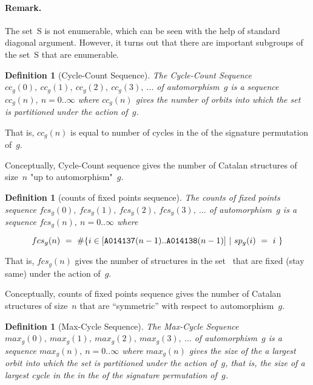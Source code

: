 \documentclass[11pt]{article} %
\newcommand{\autletter}[1]{$#1$}
\newcommand{\automorphismlet}[1]{automorphism~\autletter{#1}}
\newcommand{\EISseq}[1]{{\tt #1}}
\newcommand{\SET}[1]{{\textsc{#1}}}
\newtheorem{definition}[theorem]{Definition}
\begin{document}
\paragraph{Remark.}
The set~\SET{S} is not enumerable, which can be seen with the help
of standard diagonal argument.
However, it turns out that there are important subgroups of
the set~\SET{S} that are enumerable.


\begin{definition}[{Cycle-Count Sequence}]
\normalfont

The Cycle-Count Sequence $cc_{g}(0),~cc_{g}(1),~cc_{g}(2),~cc_{g}(3),~...$
of \automorphismlet{g} is a sequence
$cc_{g}(n),~n=0..\infty$
where $cc_g(n)$ gives the number of orbits into which the set~{\CatsetN}
is partitioned under the action of~$g$.
\end{definition}

That is, $cc_{g}(n)$ is equal to number of cycles
in the {\Subrange}
of the signature permutation of~$g$.

Conceptually, Cycle-Count sequence gives the number of Catalan structures of size~$n$
"up to automorphism"~$g$.

\begin{definition}[{counts of fixed points sequence}]
\normalfont

The counts of fixed points sequence $fcs_{g}(0),~fcs_{g}(1),~fcs_{g}(2),~fcs_{g}(3),~...$
of \automorphismlet{g} is a sequence
$fcs_{g}(n),~n=0..\infty$
where

$$
fcs_{g}(n)~=~\#\{i \in [\EISseq{A014137}(n-1)..\EISseq{A014138}(n-1)]~|~sp_{g}(i)~=~i~\}
$$

\end{definition}

That is, $fcs_{g}(n)$
gives the number of structures in the set~{\CatsetN}
that are fixed (stay same) under the action of~$g$.

Conceptually, counts of fixed points sequence gives the number of Catalan structures of size~$n$
that are ``symmetric'' with respect to automorphism~$g$.



\begin{definition}[{Max-Cycle Sequence}]
\normalfont

The Max-Cycle Sequence $max_{g}(0),~max_{g}(1),~max_{g}(2),~max_{g}(3),~...$
of \automorphismlet{g} is a sequence
$max_{g}(n),~n=0..\infty$
where $max_g(n)$ gives the size of the a largest orbit into which the set
{\CatsetN}
is partitioned under the action of~$g$, that is, the size of a largest
cycle in the in the {\Subrange}
of the signature permutation of~$g$.

\end{definition}
\end{document}
